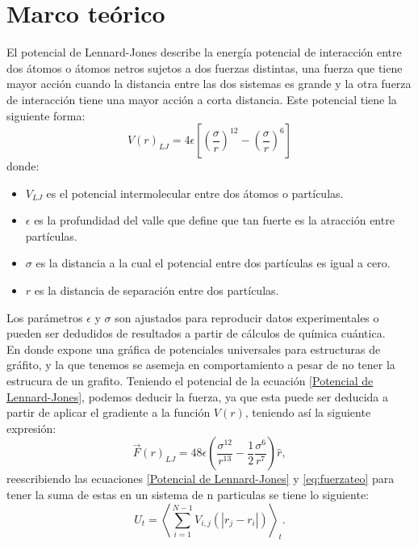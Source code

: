 \section{Marco teórico}
El potencial de Lennard-Jones describe la energía potencial de interacción entre dos átomos o átomos netros sujetos a dos fuerzas distintas, una fuerza que tiene mayor acción cuando la distancia entre las dos sistemas es grande y la otra fuerza de interacción tiene una mayor acción a corta distancia. Este potencial tiene la siguiente forma:
\begin{equation}
    \label{Potencial de Lennard-Jones}
    V(r)_{LJ} = 4 \epsilon \left[\left(\frac{\sigma}{r} \right)^{12} - \left(\frac{\sigma}{r} \right)^6 \right]
\end{equation}
donde:
\begin{itemize}
    \item $V_{LJ}$ es el potencial intermolecular entre dos átomos o partículas.
    \item $\epsilon$ es la profundidad del valle que define que tan fuerte es la atracción entre partículas.
    \item $\sigma$ es la distancia a la cual el potencial entre dos partículas es igual a cero.
    \item $r$ es la distancia de separación entre dos partículas.
\end{itemize}
Los parámetros $\epsilon$ y $\sigma$ son ajustados para reproducir datos experimentales o pueden ser dedudidos de resultados a partir de cálculos de química cuántica.\\
En donde expone una gráfica de potenciales universales para estructuras de gráfito, y la que tenemos se asemeja en comportamiento a pesar de no tener la estrucura de un grafito.
Teniendo el potencial de la ecuación \ref{Potencial de Lennard-Jones}, podemos deducir la fuerza, ya que esta puede ser deducida a partir de aplicar el gradiente a la función $V(r)$, teniendo así la siguiente expresión:
\begin{equation}
    \label{eq:fuerzateo}
    \vec{F}(r)_{LJ}= 48\epsilon \left(\frac{\sigma^{12}}{r^{13}}- \frac{1}{2}\frac{\sigma^6}{r^7} \right) \hat{r},
\end{equation}
reescribiendo las ecuaciones \ref{Potencial de Lennard-Jones} y \ref{eq:fuerzateo} para tener la suma de estas en un sistema de n particulas se tiene lo siguiente:
\begin{equation}
    \label{eq:pot-n}
    U_t=\left\langle\sum_{i=1}^{N-1} V_{i,j}(|r_{j}-r_i|)\right\rangle_t.
\end{equation}
